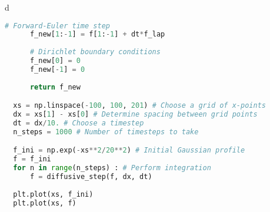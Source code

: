 \documentclass[]{homework}
\begin{document}
\begin{problem}{2}
\begin{subproblem}{d}
\begin{lstlisting}[language=Python]
      # Forward-Euler time step
      f_new[1:-1] = f[1:-1] + dt*f_lap
      
      # Dirichlet boundary conditions
      f_new[0] = 0
      f_new[-1] = 0
      
      return f_new

  xs = np.linspace(-100, 100, 201) # Choose a grid of x-points
  dx = xs[1] - xs[0] # Determine spacing between grid points
  dt = dx/10. # Choose a timestep
  n_steps = 1000 # Number of timesteps to take

  f_ini = np.exp(-xs**2/20**2) # Initial Gaussian profile
  f = f_ini
  for n in range(n_steps) : # Perform integration
      f = diffusive_step(f, dx, dt)
      
  plt.plot(xs, f_ini)
  plt.plot(xs, f)
\end{lstlisting}

  \end{subproblem}
\end{problem}
\end{document}
